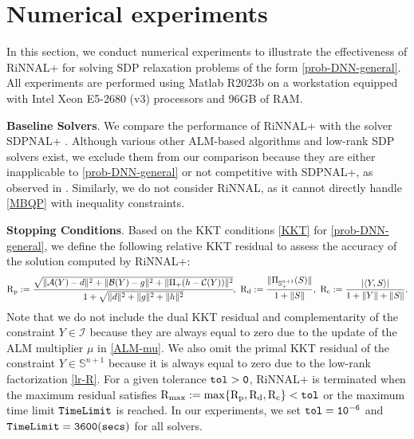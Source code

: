 \documentclass[11pt]{article}
\theoremstyle{plain}
\def\B{\mathcal{B}}
\def\C{\mathcal{C}}
\def\I{\mathcal{I}}
\def\S{\mathbb{S}}
\def\tol{\tt{tol}}
\def\timelimit{\tt{TimeLimit}}
\begin{document}

\section{Numerical experiments}\label{sec-experiments}

In this section, we conduct numerical experiments to illustrate the effectiveness of RiNNAL+ for solving SDP 
relaxation problems of the form \eqref{prob-DNN-general}. All experiments are performed using {\sc Matlab} R2023b on a workstation equipped with Intel Xeon E5-2680 (v3) processors and 96GB of RAM.

\medskip

\noindent\textbf{Baseline Solvers}. 
We compare the performance of RiNNAL+ with the solver SDPNAL+ \cite{SDPNAL,SDPNALp1,SDPNALp2}.
Although various other ALM-based algorithms and low-rank SDP solvers exist, we exclude them from our comparison because they are either inapplicable to \eqref{prob-DNN-general} or not competitive with SDPNAL+, as observed in \cite{RiNNAL}. Similarly, we do not consider RiNNAL, as it cannot directly handle \eqref{MBQP} with inequality constraints.
\medskip

\noindent\textbf{Stopping Conditions}. Based on the KKT conditions \eqref{KKT} for \eqref{prob-DNN-general}, we define the following relative KKT residual to assess the accuracy of the solution computed by RiNNAL+:
\small{
\begin{align*}
\operatorname{R_p} := \cfrac{\sqrt{\|\mathcal{A}(Y)- {d}\|^2+\|\B(Y)- {g}\|^2+\|\Pi_+(h-\C(Y))\|^2} }{1+\sqrt{\| {d} \|^2 + \| {g} \|^2+\|h\|^2}},\
\operatorname{R_d} :=  \frac{\|\Pi_{\S_+^{n+1}}(S)\|}{1+\|S\|},\
\operatorname{R_{c}} := \frac{|\langle Y, S\rangle|}{1+\|Y\|+\|S\|}.
\end{align*}
}
\normalsize
Note that we do not include the dual KKT residual and complementarity of the constraint $Y\in\I$ because they are always equal to zero due to the update of the ALM multiplier $\mu$ in \eqref{ALM-mu}. We also omit the primal KKT residual of the constraint $Y\in \S^{n+1}$ because it is always equal to zero due to the low-rank factorization \eqref{lr-R}.
For a given tolerance $\tol> 0$, RiNNAL+ is terminated when the maximum residual satisfies $\operatorname{R_{max}}:=\max\{\operatorname{R_p},\operatorname{R_d},\operatorname{R_c}\}<\tol$ or the maximum time limit $\timelimit$ is reached. In our experiments, we set $\tol = 10^{-6}$ and $\timelimit = 3600\tt{(secs)}$ for all solvers.
\end{document}
